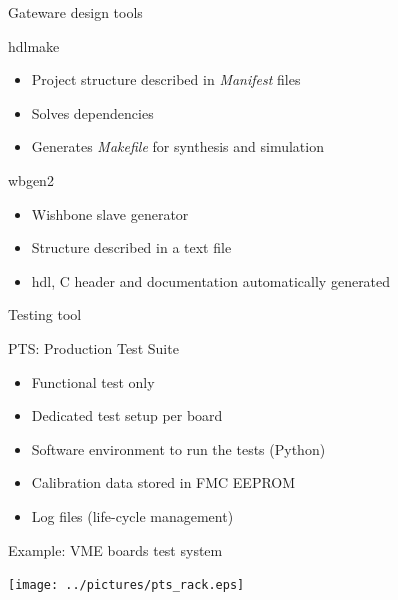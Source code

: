 \documentclass[compress,red]{beamer}
\begin{document}
\begin{frame}{Gateware design tools}

  \begin{block}{hdlmake}
    \begin{itemize}
    \item Project structure described in \textit{Manifest} files
    \item Solves dependencies
    \item Generates \textit{Makefile} for synthesis and simulation
    \end{itemize}
  \end{block}

  \begin{block}{wbgen2}
    \begin{itemize}
    \item Wishbone slave generator
    \item Structure described in a text file
    \item hdl, C header and documentation automatically generated
    \end{itemize}
  \end{block}

\end{frame}

\begin{frame}{Testing tool}

  \begin{block}{PTS: Production Test Suite}
    \begin{itemize}
    \item Functional test only
    \item Dedicated test setup per board
    \item Software environment to run the tests (Python)
    \item Calibration data stored in FMC EEPROM
    \item Log files (life-cycle management)
    \end{itemize}
  \end{block}

\end{frame}

\begin{frame}{Example: VME boards test system}

  \begin{center}
    \texttt{[image: ../pictures/pts\_rack.eps]}
  \end{center}

\end{frame}
\end{document}
